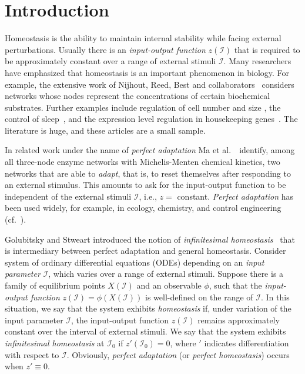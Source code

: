 \documentclass[pdflatex,sn-basic,Numbered]{sn-jnl}
\newcommand{\II}{{\mathcal I}}
\newcommand{\RED}[1]{{\color{red}{#1}}}
\theoremstyle{thmstyleone}%
\newcommand{\etal}{\textrm{et al.\,}}
\numberwithin{equation}{section}
\begin{document}

\maketitle

\section{Introduction}


Homeostasis is the ability to maintain internal stability while facing external perturbations.  
Usually there is an \emph{input-output function} $z(\II)$ that is required to be approximately constant over a range of external stimuli $\II$.
Many researchers have emphasized that homeostasis is an important phenomenon in biology.  
For example, the extensive work of Nijhout, Reed, Best and collaborators~\cite{NRBU04, RLN10, best2009homeostatic, NR14, nijhout2017systems,RBGSN17, NBR15, NBR18} considers networks whose nodes represent the concentrations of certain biochemical substrates.
Further examples include regulation of cell number and size \cite{L13}, the control of sleep~\cite{WRCD99}, and the expression level regulation in housekeeping genes~\cite{AGS18}.  
The literature is huge, and these articles are a small sample. 

In related work under the name of \emph{perfect adaptation} Ma \etal~\cite{MTELT09} identify, among all three-node enzyme networks with Michelis-Menten chemical kinetics, two networks that are able to \emph{adapt}, that is, to reset themselves after responding to an external stimulus.
This amounts to ask for the input-output function to be independent of the external stimuli $\II$, i.e., $z=$ constant.
{\em Perfect adaptation} has been used widely, for example, in ecology, chemistry, and control engineering (cf.~\cite{MTELT09, AM13, TM16, F16, QD18, AL18, DQMS18, ALGBSK19,hong2025topological,drengstig2012robust}).

Golubitsky and Stweart \cite{GS17} introduced the notion of \emph{infinitesimal homeostasis}~\cite{GS17} that is intermediary between perfect adaptation and general homeostasis.  
Consider system of ordinary differential equations (ODEs) depending on an \emph{input parameter} $\II$, which varies over a range of external stimuli.
Suppose there is a family of equilibrium points $X(\II)$ and an observable $\phi$, such that the \emph{input-output function} $z(\II)=\phi(X(\II))$ is well-defined on the range of $\II$.
In this situation, we say that the system exhibits \emph{homeostasis} if, under variation of the input parameter $\II$, the input-output function $z(\II)$ remains approximately constant over the interval of external stimuli.
We say that the system exhibits \emph{infinitesimal homeostasis} at $\II_0$ if $z'(\II_0) = 0$, where $'$ indicates differentiation with respect to $\II$.
Obviously, \emph{perfect adaptation} (or \emph{perfect homeostasis}) occurs when
$z'\equiv 0$.
\end{document}
